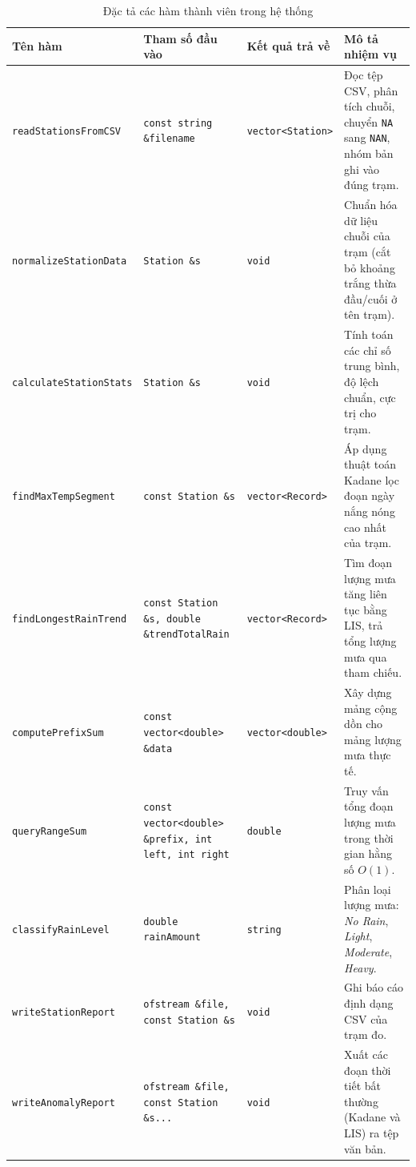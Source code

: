 \begin{table}[H]
    \centering
    \caption{Đặc tả các hàm thành viên trong hệ thống}
    \footnotesize
    \begin{tabularx}{\textwidth}{l|p{3.8cm}|p{3.5cm}|X}
        \toprule
        \textbf{Tên hàm} & \textbf{Tham số đầu vào} & \textbf{Kết quả trả về} & \textbf{Mô tả nhiệm vụ} \\
        \midrule
        \texttt{readStationsFromCSV} & \texttt{const string \&filename} & \texttt{vector<Station>} & Đọc tệp CSV, phân tích chuỗi, chuyển \texttt{NA} sang \texttt{NAN}, nhóm bản ghi vào đúng trạm. \\ \hline
        \texttt{normalizeStationData} & \texttt{Station \&s} & \texttt{void} & Chuẩn hóa dữ liệu chuỗi của trạm (cắt bỏ khoảng trắng thừa đầu/cuối ở tên trạm). \\ \hline
        \texttt{calculateStationStats} & \texttt{Station \&s} & \texttt{void} & Tính toán các chỉ số trung bình, độ lệch chuẩn, cực trị cho trạm. \\ \hline
        \texttt{findMaxTempSegment} & \texttt{const Station \&s} & \texttt{vector<Record>} & Áp dụng thuật toán Kadane lọc đoạn ngày nắng nóng cao nhất của trạm. \\ \hline
        \texttt{findLongestRainTrend} & \texttt{const Station \&s, double \&trendTotalRain} & \texttt{vector<Record>} & Tìm đoạn lượng mưa tăng liên tục bằng LIS, trả tổng lượng mưa qua tham chiếu. \\ \hline
        \texttt{computePrefixSum} & \texttt{const vector<double> \&data} & \texttt{vector<double>} & Xây dựng mảng cộng dồn cho mảng lượng mưa thực tế. \\ \hline
        \texttt{queryRangeSum} & \texttt{const vector<double> \&prefix, int left, int right} & \texttt{double} & Truy vấn tổng đoạn lượng mưa trong thời gian hằng số $O(1)$. \\ \hline
        \texttt{classifyRainLevel} & \texttt{double rainAmount} & \texttt{string} & Phân loại lượng mưa: \textit{No Rain}, \textit{Light}, \textit{Moderate}, \textit{Heavy}. \\ \hline
        \texttt{writeStationReport} & \texttt{ofstream \&file, const Station \&s} & \texttt{void} & Ghi báo cáo định dạng CSV của trạm đo. \\ \hline
        \texttt{writeAnomalyReport} & \texttt{ofstream \&file, const Station \&s...} & \texttt{void} & Xuất các đoạn thời tiết bất thường (Kadane và LIS) ra tệp văn bản. \\
        \bottomrule
    \end{tabularx}
    \label{tab:functions}
\end{table}

